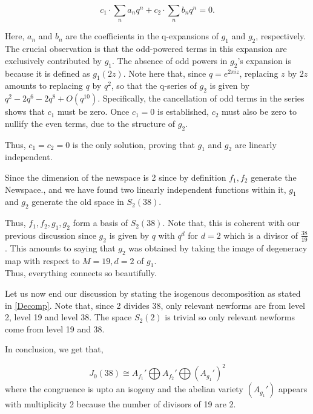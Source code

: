 \[
c_1 \cdot \sum_{n} a_n q^n + c_2 \cdot \sum_{n} b_n q^n = 0.
\]

Here, \( a_n \) and \( b_n \) are the coefficients in the q-expansions of \( g_1 \) and \( g_2 \), respectively. The crucial observation is that the odd-powered terms in this expansion are exclusively contributed by \( g_1 \). The absence of odd powers in \( g_2 \)'s expansion is because it is defined as \( g_1(2z) \). Note here that, since \( q = e^{2 \pi i z} \), replacing \( z \) by \( 2z \) amounts to replacing \( q \) by \( q^2 \), so that the q-series of \( g_2 \) is given by
\( q^2 - 2q^6 - 2q^8 + O(q^{10}) \).
Specifically, the cancellation of odd terms in the series shows that \( c_1 \) must be zero. Once \( c_1 = 0 \) is established, \( c_2 \) must also be zero to nullify the even terms, due to the structure of \( g_2 \).

Thus, \( c_1 = c_2 = 0 \) is the only solution, proving that \( g_1 \) and \( g_2 \) are linearly independent.

Since the dimension of the newspace is 2 since by definition $f_1,f_2$ generate the Newspace., and we have found two linearly independent functions within it, \( g_1 \) and \( g_2 \) generate the old space in \( S_2(38) \). 

Thus, $f_1, f_2, g_1, g_2$ form a basis of $S_2(38)$. Note that, this is coherent with our previous discussion since $g_2$ is given by $q$ with $q^d$ for $d=2$ which is a divisor of $\frac{38}{19}$. This amounts to saying that $g_2$ was obtained by taking the image of degeneracy map with respect to $M=19, d=2$ of $g_1$. \\ Thus, everything connects so beautifully. 

Let us now end our discussion by stating the isogenous decomposition as stated in \ref{Decomp}.
Note that, since 2 divides 38, only relevant newforms are from level 2, level 19 and level 38. The space $S_2(2)$ is trivial so only relevant newforms come from level 19 and 38. 

In conclusion, we get that, 

$$
J_0(38) \cong A_{f_1}' \bigoplus A_{f_2}' \bigoplus (A_{g_1}')^2
$$
where the congruence is upto an isogeny and the abelian variety $(A_{g_1}')$ appears with multiplicity 2 because the number of divisors of 19 are 2.





 
